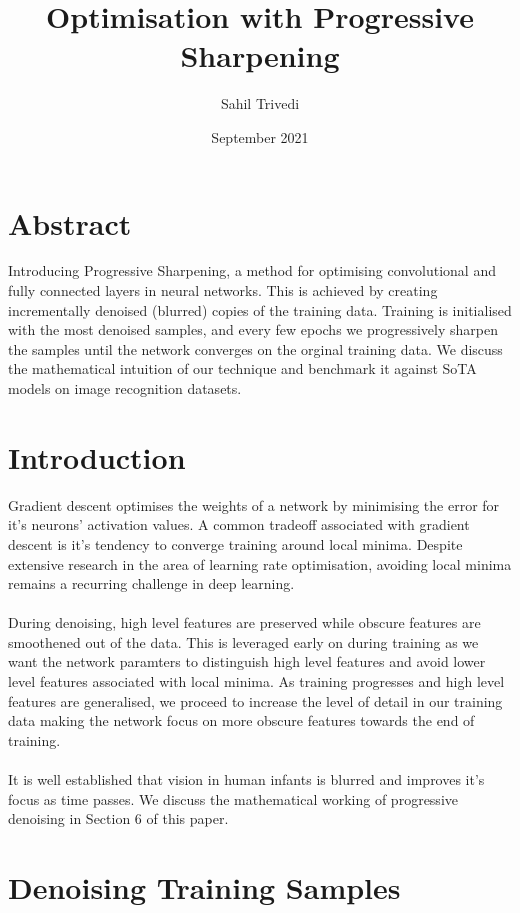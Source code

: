 \documentclass[12pt]{article}
\date{September 2021}
\title{Optimisation with Progressive Sharpening}
\author{Sahil Trivedi}
\begin{document}
	\maketitle
	
	\begin{multicols}{2}
		\section{Abstract}
		Introducing Progressive Sharpening, a method for optimising convolutional and fully connected layers in neural networks. This is achieved by creating incrementally denoised (blurred) copies of the training data. Training is initialised with the most denoised samples, and every few epochs we progressively sharpen the samples until the network converges on the orginal training data. We discuss the mathematical intuition of our technique and benchmark it against SoTA models on image recognition datasets. 
		
		\section{Introduction}
		Gradient descent optimises the weights of a network by minimising the error for it's neurons' activation values. A common tradeoff associated with gradient descent is it's tendency to converge training around local minima. Despite extensive research in the area of learning rate optimisation, avoiding local minima remains a recurring challenge in deep learning.
		\\\\
		During denoising, high level features are preserved while obscure features are smoothened out of the data. This is leveraged early on during training as we want the network paramters to distinguish high level features and avoid lower level features associated with local minima. As training progresses and high level features are generalised, we proceed to increase the level of detail in our training data making the network focus on more obscure features towards the end of training.
		\\\\
		It is well established that vision in human infants is blurred and improves it's focus as time passes. We discuss the mathematical working of progressive denoising in Section 6 of this paper.  
		
		\section{Denoising Training Samples}
		

\end{multicols}
\end{document}
